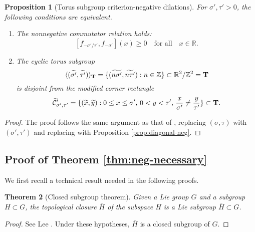 \documentclass[11pt, letterpaper, reqno]{amsart}
\newtheorem{thm}{Theorem}[section]
\newtheorem{prop}[thm]{Proposition}
\theoremstyle{definition}
\theoremstyle{remark}
\numberwithin{equation}{section}
\newcommand{\RR}{\ensuremath{\mathbb{R}}}
\newcommand{\ZZ}{\ensuremath{\mathbb{Z}}}
\newcommand{\bT}{{\bf T}}
\newcommand{\cCprimebar}{\widetilde{\mathcal{C}}'}
\newcommand{\tbetap}{{\sigma'}}
\newcommand{\trhop}{{\tau'}}
\newcommand{\talpha}{{\sigma}}
\newcommand{\trho}{{\tau}}
\begin{document}
%
%
\begin{prop}[Torus subgroup criterion-negative dilations]
\label{lem:torus-neg}
For $\tbetap,\trhop>0$, the following conditions are equivalent.
\begin{enumerate}
\item[\textnormal{(Q1')}] 
The nonnegative commutator relation holds:
\[ 
[f_{-\tbetap/\trhop}, f_{-\tbetap}] (x) \geq 0 \quad \mbox{for all} \quad x \in \RR.
 \] 


\item[\textnormal{(Q2')}] 
The cyclic torus subgroup 
\[
\langle (\widetilde{\tbetap},\widetilde{\trhop}) \rangle_{\bT} 
= {\{ (\widetilde{n\tbetap}, \widetilde{n\trhop} ) : n\in \ZZ \}}  \subset \RR^2/\ZZ^2=
\bT
\] 
is disjoint from the modified corner rectangle  
\[
\cCprimebar_{\tbetap,\trhop} = \{(\widetilde{x},\widetilde{y}) : 0\leq x \leq \tbetap, 
\, 0<y<\trhop,\, \frac{x}{\tbetap} \neq \frac{y}{\trhop} \} 
\subset \bT .
\]
\end{enumerate}
\end{prop}

\begin{proof}
The proof follows  the same argument as that of 
\cite[Proposition 6.2]{LagR:2018a}, replacing $(\talpha,\trho)$ with $(\tbetap, \trhop)$ and replacing 
\cite[Proposition 5.2]{LagR:2018a}  with Proposition \ref{prop:diagonal-neg}.
\end{proof}


%
%

\subsection{Proof of  Theorem \ref{thm:neg-necessary}}
\label{sec:neg-necess-proof}

We first recall a technical result needed  in the following proofs.

\begin{thm}[Closed subgroup theorem]
\label{thm:lie-subgroup}
Given a Lie group $G$ and a subgroup $H\subset G$, 
the topological closure $\bar{H}$ of the subspace $H$ is a Lie subgroup $\bar{H}\subset G$.
\end{thm}
\begin{proof}
See  Lee \cite[Theorem 20.12, p. 523]{Lee13}.
Under these hypotheses, $\bar{H}$ is a closed subgroup of $G$.
\end{proof}
\end{document}
